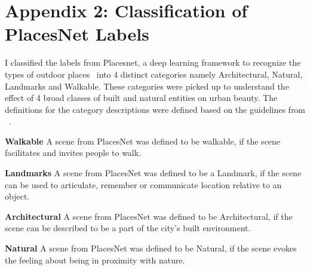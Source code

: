 \chapter{Appendix 2: Classification of PlacesNet Labels}
\label{chap:app2}
I classified the labels from Placesnet, a deep learning framework to recognize the types of outdoor places~\cite{zhou2014learning} into 4 distinct categories namely Architectural, Natural, Landmarks and Walkable. These categories were picked up to understand the effect of 4 broad classes of built and natural entities on urban beauty. The definitions for the category descriptions were defined based on the guidelines from ~\cite{ewing2013measuring}.

\begin{definition}
    \textbf{Walkable} A scene from PlacesNet was defined to be walkable, if the scene facilitates and invites people to walk.
\end{definition}

\begin{definition}
    \textbf{Landmarks} A scene from PlacesNet was defined to be a Landmark, if the scene can be used to articulate, remember or communicate location relative to an object.
\end{definition}

\begin{definition}
    \textbf{Architectural} A scene from PlacesNet was defined to be Architectural, if the scene can be described to be a part of the city's built environment.
\end{definition}

\begin{definition}
    \textbf{Natural} A scene from PlacesNet was defined to be Natural, if the scene evokes the feeling about being in proximity with nature.
\end{definition}


